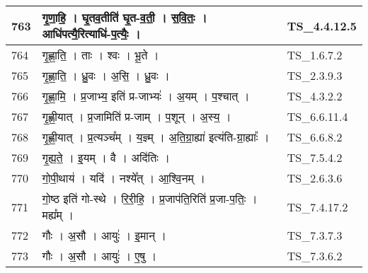 \documentclass[17pt]{extarticle}
\begin{document}
\begin{longtable}{||p{0.4in}||p{4.9in}||p{0.9in}||}
    \hline
        
    763 & गृ॒णा॒हि॒   ।   घृ॒तव॒तीति॑ घृ॒त{-}व॒ती॒   ।   स॒वि॒तः॒   ।   आधि॑पत्यै॒रित्याधि॑{-}प॒त्यैः॒   ।    & TS\_4.4.12.5       \\
    
    \hline
        
    764 & गृ॒ह्णा॒ति॒   ।   ताः   ।   श्वः   ।   भू॒ते   ।    & TS\_1.6.7.2       \\
    
    \hline
        
    765 & गृ॒ह्णा॒ति॒   ।   ध्रु॒वः   ।   अ॒सि॒   ।   ध्रु॒वः   ।    & TS\_2.3.9.3       \\
    
    \hline
        
    766 & गृ॒ह्णा॒मि॒   ।   प्र॒जाभ्य॒ इति॑ प्र{-}जाभ्यः॑   ।   अ॒यम्   ।   प॒श्चात्   ।    & TS\_4.3.2.2       \\
    
    \hline
        
    767 & गृ॒ह्णी॒यात्   ।   प्र॒जामिति॑ प्र{-}जाम्   ।   प॒शून्   ।   अ॒स्य॒   ।    & TS\_6.6.11.4       \\
    
    \hline
        
    768 & गृ॒ह्णी॒यात्   ।   प्र॒त्यञ्च᳚म्   ।   य॒ज्ञ्म्   ।   अ॒ति॒ग्रा॒ह्या॑ इत्य॑ति{-}ग्रा॒ह्याः᳚   ।    & TS\_6.6.8.2       \\
    
    \hline
        
    769 & गृ॒ह्य॒ते॒   ।   इ॒यम्   ।   वै   ।   अदि॑तिः   ।    & TS\_7.5.4.2       \\
    
    \hline
        
    770 & गो॒पी॒थाय॑   ।   यदि॑   ।   नश्ये᳚त्   ।   आ॒श्वि॒नम्   ।    & TS\_2.6.3.6       \\
    
    \hline
        
    771 & गो॒ष्ठ इति॑ गो{-}स्थे   ।   रि॒री॒हि॒   ।   प्र॒जाप॑ति॒रिति॑ प्र॒जा{-}प॒तिः॒   ।   मह्य᳚म्   ।    & TS\_7.4.17.2       \\
    
    \hline
        
    772 & गौः   ।   अ॒सौ   ।   आयुः॑   ।   इ॒मान्   ।    & TS\_7.3.7.3       \\
    
    \hline
        
    773 & गौः   ।   अ॒सौ   ।   आयुः॑   ।   ए॒षु   ।    & TS\_7.3.6.2       \\
    

\end{longtable}
\end{document}
